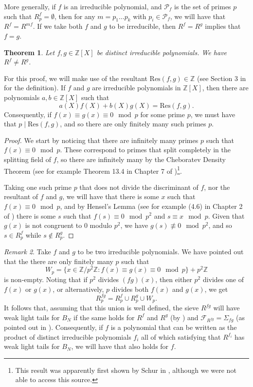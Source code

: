 \documentclass[a4paper,11pt,reqno]{amsart}
\theoremstyle{plain}
\newtheorem{theorem}{Theorem}[section]
\theoremstyle{remark}
\newtheorem{remark}[theorem]{Remark}
\newcommand{\z}{\mathbb{Z}}
\newcommand{\cf}{\mathcal{F}}
\newcommand{\cp}{\mathcal{P}}
\begin{document}
				More generally, if $f$ is an irreducible polynomial, and $\cp_f$ is the set of primes $p$ such that $R_p^f = \emptyset$, then for any $m = p_1\dots p_k$ with $p_i \in \cp_f$, we will have that $R^f = R^{mf}$. If we take both $f$ and $g$ to be irreducible, then $R^f = R^g$ implies that $f= g$.
				
				\begin{theorem}
					Let $f,g \in \z[X]$ be distinct irreducible polynomials. We have $R^f \neq R^g$.
				\end{theorem} 
				
				For this proof, we will make use of the resultant $\text{Res}(f,g) \in \z$ (see Section 3 in \cite{Cox} for the definition). If $f$ and $g$ are irreducible polynomials in $\z[X]$, then there are polynomials $a,b \in \z[X]$ such that $$a(X)f(X)+b(X)g(X) = \text{Res}(f,g).$$ Consequently, if $f(x) \equiv g(x) \equiv 0 \mod p$ for some prime $p$, we must have that $p \mid \text{Res}(f,g)$, and so there are only finitely many such primes $p$.
				
				\begin{proof}
					We start by noticing that there are infinitely many primes $p$ such that $f(x) \equiv 0 \mod p$. These correspond to primes that split completely in the splitting field of $f$, so there are infinitely many by the Cheboratev Density Theorem (see for example Theorem 13.4 in Chapter 7 of \cite{Neukirch})\footnote{This result was apparently first shown by Schur in \cite{Schur}, although we were not able to access this source.}. 
					
					Taking one such prime $p$ that does not divide the discriminant of $f$, nor the resultant of $f$ and $g$, we will have that there is some $x$ such that $f(x) \equiv 0 \mod p$, and by Hensel's Lemma (see for example (4.6) in Chapter 2 of \cite{Neukirch}) there is some $s$ such that $f(s) \equiv 0 \mod p^2$ and $s \equiv x \mod p$.  Given that $g(x)$ is not congruent to $0$ modulo $p^2$, we  have $g(s) \not \equiv 0 \mod p^2$, and so $s \in R^f_p$ while $s \not \in R^g_p$.
				\end{proof}
				
				\begin{remark}
					\label{rmk: products of polynomials}
					Take $f$ and $g$ to be two irreducible polynomials. We have pointed out that the there are only finitely many $p$ such that $$W_p = \{x \in \z/p^2\z: f(x) \equiv g(x) \equiv 0 \mod p\} + p^2\z$$ is non-empty. Noting that if $p^2$ divides $(fg)(x)$, then either $p^2$ divides one of $f(x)$ or $g(x)$, or alternatively, $p$ divides both $f(x)$ and $g(x)$, we get $$R_p^{fg} = R_p^f\cup R_p^g \cup W_p.$$ It follows that, assuming that this union is well defined, the sieve $R^{fg}$ will have weak light tails for $B_N$ if the same holds for $R^f$ and $R^g$ (by ) and $\cf_{R^{fg}} = \Sigma_{fg}$ (as pointed out in ). Consequently, if $f$ is a polynomial that can be written as the product of distinct irreducible polynomials $f_i$ all of which satisfying that $R^{f_i}$ has weak light tails for $B_N$, we will have that  also holds for $f$.
				\end{remark}
				
\end{document}
